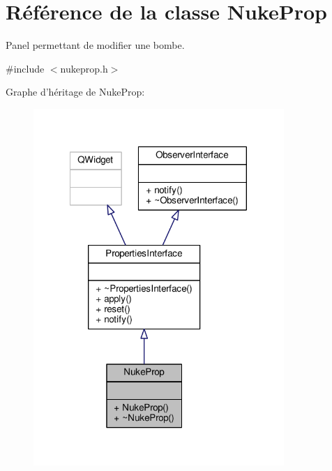 \hypertarget{classNukeProp}{\section{Référence de la classe Nuke\+Prop}
\label{classNukeProp}
}


Panel permettant de modifier une bombe.  




{\ttfamily \#include $<$nukeprop.\+h$>$}



Graphe d'héritage de Nuke\+Prop\+:\nopagebreak
\begin{figure}[H]
\begin{center}
\leavevmode
\includegraphics[width=269pt]{dc/d49/classNukeProp__inherit__graph}
\end{center}
\end{figure}


